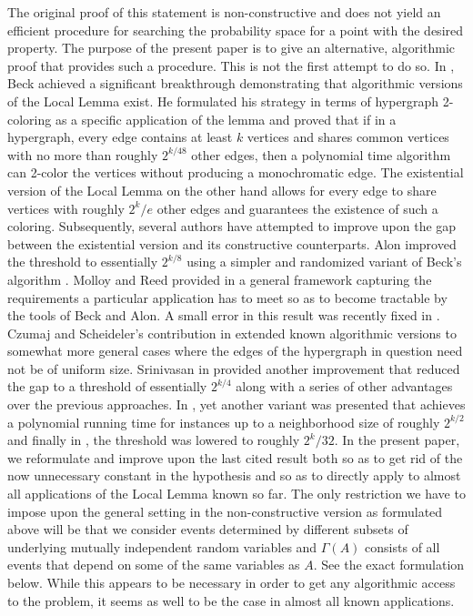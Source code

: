 \documentclass[11pt,a4paper]{article}
\begin{document}
The original proof of this statement is non-constructive and does not yield an efficient procedure for
searching the probability space for a point with the desired property. The purpose of the present paper is to give 
an alternative, algorithmic proof that provides such a procedure. This is not the first attempt to do
so. In \cite{Bec91}, Beck achieved a significant breakthrough demonstrating that algorithmic versions of the
Local Lemma exist. He formulated his strategy in terms of hypergraph 2-coloring as a specific application
of the lemma and proved that if in a hypergraph, every edge contains at least $k$ vertices and shares common
vertices with no more than roughly $2^{k/48}$ other edges, then a polynomial time algorithm can 2-color the
vertices without producing a monochromatic edge. The existential version of the Local Lemma on the other hand
allows for every edge to share vertices with roughly $2^{k}/e$ other edges and guarantees the existence of such
a coloring. Subsequently, several authors have attempted to improve upon the gap between the existential version
and its constructive counterparts. Alon improved the threshold to essentially $2^{k/8}$ 
using a simpler and randomized variant of Beck's algorithm \cite{Alo91}. Molloy and Reed provided in \cite{MR98}
a general framework capturing the requirements a particular application has to meet so as to become tractable by
the tools of Beck and Alon. A small error in this result was recently fixed in
\cite{PT09}. Czumaj and Scheideler's contribution in \cite{CS00} extended known algorithmic versions
to somewhat more general cases where the edges of the hypergraph in question need not be of uniform size. Srinivasan 
in \cite{Sri08} provided another improvement that reduced the gap to a threshold of essentially $2^{k/4}$ along with
a series of other advantages over the previous approaches. In \cite{Mos08a}, yet another variant was presented
that achieves a polynomial running time for instances up to a neighborhood size of roughly $2^{k/2}$ and finally
in \cite{Mos08b}, the threshold was lowered to roughly $2^{k}/32$. In the present paper,
we reformulate and improve upon the last cited result both so as to get rid of the now unnecessary constant in the
hypothesis and so as to directly apply to almost all applications of the Local Lemma known so far. The only restriction
we have to impose upon the general setting in the non-constructive version as formulated above will be that we
consider events determined by different subsets of underlying mutually independent random variables
and $\Gamma(A)$ consists of all events that depend on some of the same
variables as $A$. See the exact formulation below. While this appears to be necessary in order to get any algorithmic access to the
problem, it seems as well to be the case in almost all known applications. 
\end{document}
